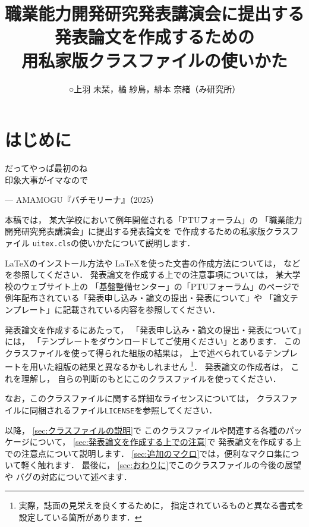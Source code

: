 \documentclass[lualatex,fleqn]{uitex}
\title{%
  職業能力開発研究発表講演会に提出する発表論文を作成するための\\
  {\LuaLaTeX}用私家版クラスファイル{\UiTeXcls}の使いかた}
\author{%
  ○上羽 未栞，橘 紗鳥，緋本 奈緒（み研究所）}
\DeclareRobustCommand\UiTeXcls{\texttt{uitex.cls}}
\begin{document}
\maketitle

\section{はじめに}

\begin{tcolorbox}[
    enhanced,
    left skip=.5\zw,
    boxsep=0pt,
    frame engine=empty, boxrule=0pt,
    left=\dimexpr1.5\zw+.25mm\relax, right=0pt,
    sharp corners,
    borderline west={.5mm}{0pt}{black!75!white},
    colback=white]
  だってやっぱ最初のね\\
  印象大事がイマなので\par
  \hfill--- AMAMOGU『バチモリーナ』（2025）
\end{tcolorbox}

本稿では，
某大学校において例年開催される「PTUフォーラム」の
「職業能力開発研究発表講演会」に提出する発表論文を
{\LuaLaTeX}で作成するための私家版クラスファイル
{\UiTeXcls}の使いかたについて説明します．

{\LaTeX}のインストール方法や
{\LaTeX}を使った文書の作成方法については，
などを参照してください．
発表論文を作成する上での注意事項については，
某大学校のウェブサイト上の
「基盤整備センター」の「PTUフォーラム」のページ\cite{PTUForum}で
例年配布されている「発表申し込み・論文の提出・発表について」や
「論文テンプレート」に記載されている内容を参照してください．

発表論文を作成するにあたって，
「発表申し込み・論文の提出・発表について」には，
「テンプレートをダウンロードしてご使用ください」とあります．
このクラスファイルを使って得られた組版の結果は，
上で述べられているテンプレートを用いた組版の結果と異なるかもしれません%
\footnote{実際，誌面の見栄えを良くするために，
  指定されているものと異なる書式を設定している箇所があります．}．
発表論文の作成者は，
これを理解し，
自らの判断のもとにこのクラスファイルを使ってください．

なお，このクラスファイルに関する詳細なライセンスについては，
クラスファイルに同梱されるファイル\texttt{LICENSE}を参照してください．

以降，
\ref{sec:クラスファイルの説明}で
このクラスファイルや関連する各種のパッケージについて，
\ref{sec:発表論文を作成する上での注意}で
発表論文を作成する上での注意点について説明します．
\ref{sec:追加のマクロ}では，便利なマクロ集について軽く触れます．
最後に，
\ref{sec:おわりに}でこのクラスファイルの今後の展望や
バグの対応について述べます．
\end{document}
